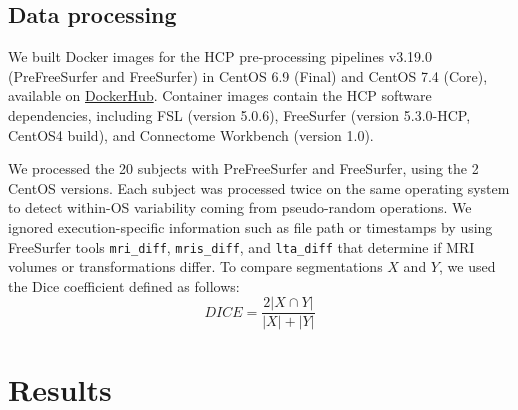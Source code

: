 \documentclass[a4paper,num-refs]{oup-contemporary}
\begin{document}

\subsection{Data processing}

We built Docker images for the HCP pre-processing pipelines v3.19.0
(PreFreeSurfer and FreeSurfer) in CentOS 6.9 (Final) and CentOS 7.4 (Core), available on
\href{https://hub.docker.com/r/bigdatalabteam/hcp-prefreesurfer/}{DockerHub}.
Container images contain the HCP software dependencies, including FSL
(version 5.0.6), FreeSurfer (version 5.3.0-HCP, CentOS4 build), and
Connectome Workbench (version 1.0).

We processed the 20 subjects with PreFreeSurfer and FreeSurfer, using the 2
CentOS versions. Each subject was processed twice on the same operating
system to detect within-OS variability coming from pseudo-random
operations. We ignored execution-specific information such as file path or
timestamps by using FreeSurfer tools \texttt{mri\_diff},
\texttt{mris\_diff}, and \texttt{lta\_diff} that determine if MRI volumes
or transformations differ. To compare segmentations $X$ and $Y$, we used the Dice coefficient defined as follows:
\[DICE=\frac{2|X \cap Y|}{|X| + |Y|}\]



\section{Results}

\end{document}
